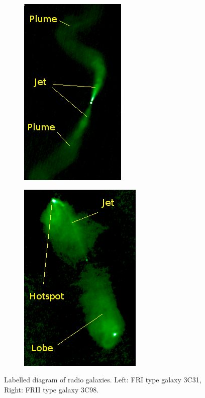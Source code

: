 \documentclass[10pt,a4paper]{article}
\begin{document}
\begin{figure}[H]
\centering
\begin{subfigure}[b]{0.49\textwidth}
	\centering
	\includegraphics[height=\textwidth]{fr2}
\end{subfigure}
\begin{subfigure}[b]{0.49\textwidth}
	\centering
	\includegraphics[height=\textwidth]{fr1}
\end{subfigure}

\caption{Labelled diagram of radio galaxies. Left: FRI type galaxy 3C31, Right: FRII type galaxy 3C98\footnotemark.}
\label{fr}
\end{figure}
\end{document}
